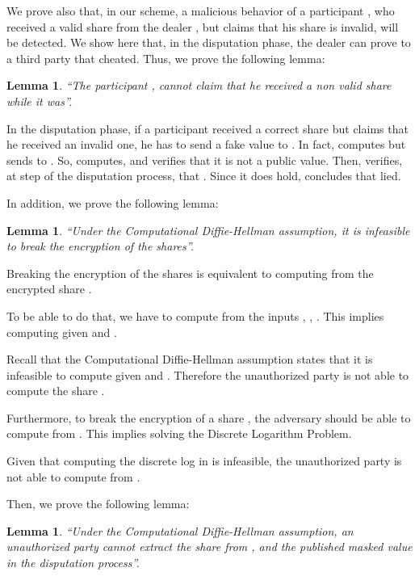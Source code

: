 \documentclass[submission,copyright,creativecommons]{eptcs}
\newtheorem{lemma}[theorem]{Lemma}
\newenvironment{proof}[1][Proof]{\begin{trivlist}
\item[\hskip \labelsep {\bfseries #1}]}{\end{trivlist}}
\begin{document}
We prove also that, in our scheme, a malicious behavior of a participant , who received a valid share from the dealer , but claims that his
share is invalid, will be detected. We show here that, in the disputation
phase, the dealer  can prove to a third party  that  cheated. Thus, we prove the following lemma:

\begin{lemma}
\textquotedblleft The participant , cannot claim that he received a
non valid share while it was\textquotedblright .
\end{lemma}

\begin{proof}
In the disputation phase, if a participant  received a correct share  but
claims that he received an invalid one, he has to send a fake value  to . In fact,  computes  but sends   to .
So,  computes,  and verifies that it is not a
public value. Then,  verifies, at step  of the disputation process,
that  . Since it does hold,  concludes that  lied.
\end{proof}

In addition, we prove the following lemma:

\begin{lemma}
\textquotedblleft Under the Computational Diffie-Hellman assumption, it is
infeasible to break the encryption of the shares\textquotedblright .
\end{lemma}

\begin{proof}
Breaking the encryption of the shares is equivalent to computing 
from the encrypted share . 

To be able to do that, we have to compute  from
the inputs , , . This implies computing  given  and . 

Recall that the Computational Diffie-Hellman assumption states that it is infeasible to
compute  given  and . Therefore
the unauthorized party is not able to compute the share .

Furthermore, to break the encryption of a share , the adversary
should be able to compute  from . This implies solving the
Discrete Logarithm Problem. 

Given that computing the discrete log in 
is infeasible, the unauthorized party is not able to compute  from .
\end{proof}

Then, we prove the following lemma:

\begin{lemma}
\textquotedblleft Under the Computational Diffie-Hellman assumption, an
unauthorized party cannot extract the share  from ,  and the published masked value  in the
disputation process\textquotedblright .
\end{lemma}
\end{document}
